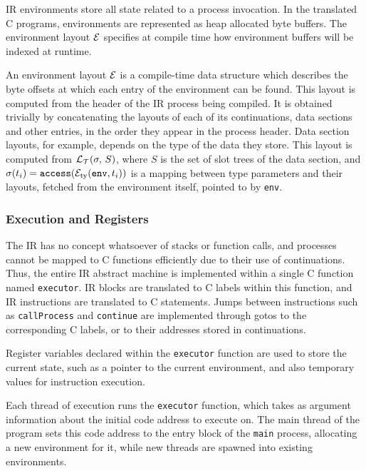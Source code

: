 \documentclass[sigconf,nonacm,natbib=true]{acmart}
\begin{document}
\ac{IR} environments store all state related to a process invocation. In the translated C programs, environments are represented as heap allocated byte buffers. The environment layout $\mathcal{E}$ specifies at compile time how environment buffers will be indexed at runtime.

An environment layout $\mathcal{E}$ is a compile-time data structure which describes the byte offsets at which each entry of the environment can be found. This layout is computed from the header of the \ac{IR} process being compiled. It is obtained trivially by concatenating the layouts of each of its continuations, data sections and other entries, in the order they appear in the process header. Data section layouts, for example, depends on the type of the data they store. This layout is computed from $\mathcal{L}_{\mathcal{T}}(\sigma,\,S)$, where $S$ is the set of slot trees of the data section, and $\sigma(t_i) = \texttt{access}(\mathcal{E}_\text{ty}(\texttt{env}, t_i))$ is a mapping between type parameters and their layouts, fetched from the environment itself, pointed to by \texttt{env}.

\subsubsection{Execution and Registers}

The \ac{IR} has no concept whatsoever of stacks or function calls, and processes cannot be mapped to C functions efficiently due to their use of continuations. Thus, the entire \ac{IR} abstract machine is implemented within a single C function named \texttt{executor}. \ac{IR} blocks are translated to C labels within this function, and \ac{IR} instructions are translated to C statements. Jumps between instructions such as \texttt{callProcess} and \texttt{continue} are implemented through gotos to the corresponding C labels, or to their addresses stored in continuations.

Register variables declared within the \texttt{executor} function are used to store the current state, such as a pointer to the current environment, and also temporary values for instruction execution.

Each thread of execution runs the \texttt{executor} function, which takes as argument information about the initial code address to execute on. The main thread of the program sets this code address to the entry block of the \texttt{main} process, allocating a new environment for it, while new threads are spawned into existing environments.
\end{document}
